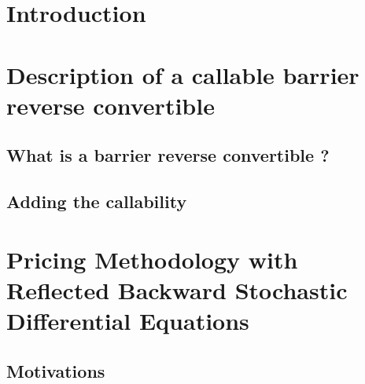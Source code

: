 \documentclass[a4paper,11pt,english]{book}
\begin{document}
\pagestyle{empty}
\tableofcontents
\listoffigures
\listoftables

\mainmatter
\chapter*{Introduction}
\vspace*{-2cm}


\pagestyle{fancy}

\chapter{Description of a callable barrier reverse convertible}

\section{What is a barrier reverse convertible ?}
\label{sec:BRC-definition}

\section{Adding the callability}



\pagestyle{fancy}

\chapter{Pricing Methodology with Reflected Backward Stochastic Differential Equations}

\section{Motivations}
\end{document}
